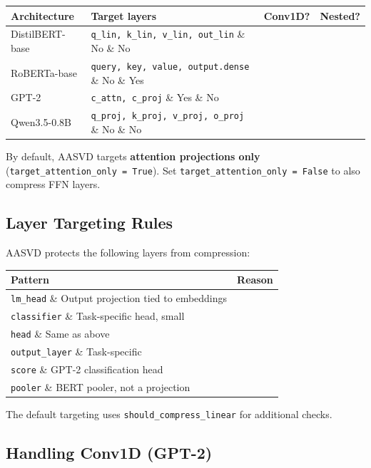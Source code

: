 \begin{table}[H]
\centering
\small
\begin{tabular}{llll}
\toprule
\textbf{Architecture} & \textbf{Target layers} & \textbf{Conv1D?} & \textbf{Nested?} \\
\midrule
DistilBERT-base & \texttt{q\_lin, k\_lin, v\_lin, out\_lin} \& No \& No \\
RoBERTa-base & \texttt{query, key, value, output.dense} \& No \& Yes \\
GPT-2 & \texttt{c\_attn, c\_proj} \& Yes \& No \\
Qwen3.5-0.8B & \texttt{q\_proj, k\_proj, v\_proj, o\_proj} \& No \& No \\
\bottomrule
\end{tabular}
\end{table}

By default, AASVD targets \textbf{attention projections only} 
(\texttt{target\_attention\_only = True}). Set \texttt{target\_attention\_only = False} to 
also compress FFN layers.

\subsection{Layer Targeting Rules}

AASVD protects the following layers from compression:

\begin{table}[H]
\centering
\small
\begin{tabular}{ll}
\toprule
\textbf{Pattern} & \textbf{Reason} \\
\midrule
\texttt{lm\_head} \& Output projection tied to embeddings \\
\texttt{classifier} \& Task-specific head, small \\
\texttt{head} \& Same as above \\
\texttt{output\_layer} \& Task-specific \\
\texttt{score} \& GPT-2 classification head \\
\texttt{pooler} \& BERT pooler, not a projection \\
\bottomrule
\end{tabular}
\end{table}

The default targeting uses \texttt{should\_compress\_linear} for additional checks.

\subsection{Handling Conv1D (GPT-2)}


